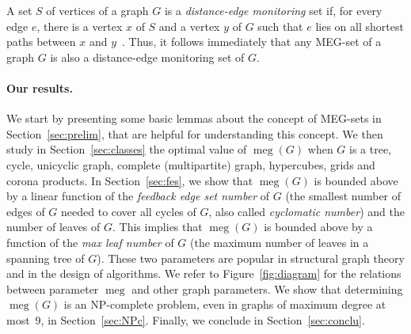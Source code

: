 \documentclass[10pt,a4paper]{article}
\DeclareMathOperator{\MEG}{meg}
\begin{document}
A set $S$ of vertices of a graph $G$ is a \emph{distance-edge monitoring} set if, for every edge $e$, there is a vertex $x$ of $S$ and a vertex $y$ of $G$ such that $e$ lies on all shortest paths between $x$ and $y$~\cite{r1,r1j}. Thus, it follows immediately that any MEG-set of a graph $G$ is also a distance-edge monitoring set of $G$.


\paragraph{Our results.} 
 We start by presenting some basic lemmas about the concept of MEG-sets in Section~\ref{sec:prelim}, that are helpful for understanding this concept. We then study in Section~\ref{sec:classes} the optimal value of $\MEG(G)$ when $G$ is a tree, cycle, unicyclic graph, complete (multipartite) graph, hypercubes, grids and corona products. In Section~\ref{sec:fes}, we show that $\MEG(G)$ is bounded above by a linear function of the \emph{feedback edge set number} of $G$ (the smallest number of edges of $G$ needed to cover all cycles of $G$, also called \emph{cyclomatic number}) and the number of leaves of $G$. This implies that $\MEG(G)$ is bounded above by a function of the \emph{max leaf number} of $G$ (the maximum number of leaves in a spanning tree of $G$). These two parameters are popular in structural graph theory and in the design of algorithms. We refer to Figure~\ref{fig:diagram} for the relations between parameter $\MEG$ and other graph parameters. We show  that determining $\MEG(G)$ is an NP-complete problem, even in graphs of maximum degree at most~9, in Section~\ref{sec:NPc}. Finally, we conclude in Section~\ref{sec:conclu}.
\end{document}
